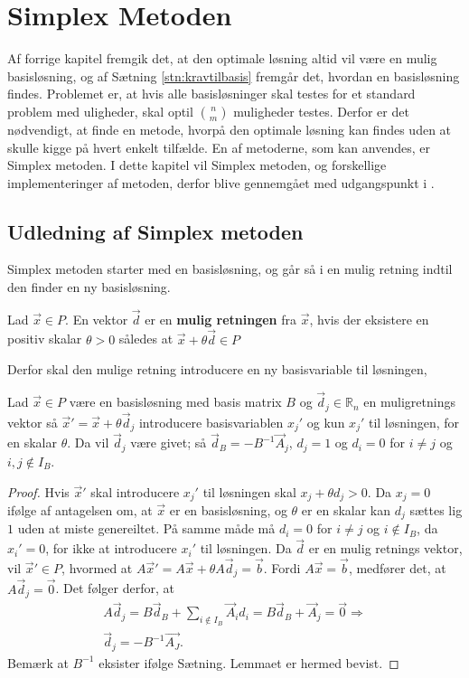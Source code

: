 \chapter{Simplex Metoden}
Af forrige kapitel fremgik det, at den optimale løsning altid vil være en mulig basisløsning, og af Sætning \ref{stn:kravtilbasis}
fremgår det, hvordan en basisløsning findes. 
Problemet er, at hvis alle basisløsninger skal testes for et standard problem med uligheder, skal optil $\binom{n}{m}$ muligheder testes. 
Derfor er det nødvendigt, at finde en metode, hvorpå den optimale løsning kan findes uden at skulle kigge på hvert enkelt tilfælde. 
En af metoderne, som kan anvendes, er Simplex metoden. I dette kapitel vil Simplex metoden, og forskellige implementeringer af metoden, derfor blive gennemgået med udgangspunkt i .
\section{Udledning af Simplex metoden}
Simplex metoden starter med en basisløsning, og går så i en mulig retning indtil den finder en ny basisløsning.
\begin{defn}
Lad $\vec{x} \in P$. En vektor $\vec{d}$ er en \textbf{mulig retningen} fra $\vec{x}$, hvis der eksistere en positiv skalar $\theta > 0$ således at $\vec{x}+\theta\vec{d} \in P$ 
\end{defn}
Derfor skal den mulige retning introducere en ny basisvariable til løsningen,
\begin{lma}
Lad $\vec{x} \in P$ være en basisløsning med basis matrix $B$ og $\vec{d}_j  \in \mathds{R}_n$ en muligretnings vektor så $\vec{x}' = \vec{x}+ \theta\vec{d}_j$ introducere basisvariablen $x_j'$ og kun $x_j'$ til løsningen, for en skalar $\theta$.
Da vil $\vec{d}_j$ være givet; så $\vec{d}_B = -B^{-1}\vec{A}_j$, $d_j = 1$ og $d_i = 0$ for $i \neq j$ og $ i,j \notin I_B$.
\label{lma:retningsvektor}
\end{lma}
\begin{proof}
Hvis $\vec{x}'$ skal introducere $x_j'$ til løsningen skal $x_j + \theta d_j > 0$. 
Da $x_j = 0$ ifølge af antagelsen om, at $\vec{x}$ er en basisløsning, og $\theta$ er en skalar kan $d_j$ sættes lig $1$ uden at miste genereiltet. 
På samme måde må $d_i = 0$ for $i \neq j$ og $i \notin I_B$, da $x_i' = 0$, for ikke at introducere $x_i'$ til løsningen.
Da $\vec{d}$ er en mulig retnings vektor, vil $\vec{x}' \in P$, hvormed at $A\vec{x}' = A\vec{x}+ \theta A\vec{d}_j = \vec{b}$. 
Fordi $A\vec{x} = \vec{b}$, medfører det, at $A\vec{d}_j = \vec{0}$.
Det følger derfor, at
\begin{align*}
A\vec{d}_j = B \vec{d}_B + \sum_{i \notin I_B} \vec{A}_id_i = B\vec{d}_B + \vec{A}_j = \vec{0} \Rightarrow
\\ \vec{d}_j = -B^{-1}\vec{A_J}.
\end{align*}
Bemærk at $B^{-1}$ eksister ifølge Sætning. 
Lemmaet er hermed bevist.
\end{proof}
